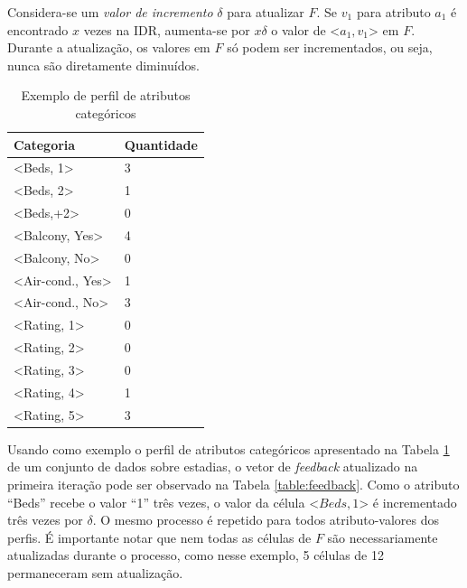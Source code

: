 Considera-se um {\em valor de incremento} $\delta$ para atualizar $F$. Se $v_1$ para atributo $a_1$ é encontrado $x$ vezes na IDR, aumenta-se por $x\delta$ o valor de \textless{}$a_1, v_1$\textgreater{} em $F$. Durante a atualização, os valores em $F$ só podem ser incrementados, ou seja, nunca são diretamente diminuídos.

\begin{table}[!h]
	\caption{Exemplo de perfil de atributos categóricos}
	\label{table:attribs}
	\centering
	\begin{tabular}{ll}
	\hline
	\textbf{Categoria}                      & \textbf{Quantidade} \\ \hline
	\textless{}Beds, 1\textgreater{}        & 3                   \\
	\textless{}Beds, 2\textgreater{}        & 1                   \\ 
	\textless{}Beds,+2\textgreater{}        & 0                   \\ 
	\textless{}Balcony, Yes\textgreater{}   & 4                   \\ 
	\textless{}Balcony, No\textgreater{}    & 0                   \\ 
	\textless{}Air-cond., Yes\textgreater{} & 1                   \\ 
	\textless{}Air-cond., No\textgreater{}  & 3                   \\ 
	\textless{}Rating, 1\textgreater{}      & 0                   \\ 
	\textless{}Rating, 2\textgreater{}      & 0                   \\ 
	\textless{}Rating, 3\textgreater{}      & 0                   \\ 
	\textless{}Rating, 4\textgreater{}      & 1                   \\ 
	\textless{}Rating, 5\textgreater{}      & 3                   \\ \hline
	\end{tabular}
	\mfonte
\end{table}

Usando como exemplo o perfil de atributos categóricos apresentado na Tabela \ref{table:attribs} de um conjunto de dados sobre estadias, o vetor de {\em feedback} atualizado na primeira iteração pode ser observado na Tabela \ref{table:feedback}. Como o atributo ``Beds'' recebe o valor ``1'' três vezes, o valor da célula \textless{}$Beds, 1$\textgreater{} é incrementado três vezes por $\delta$. O mesmo processo é repetido para todos atributo-valores dos perfis. É importante notar que nem todas as células de $F$ são necessariamente atualizadas durante o processo, como nesse exemplo, 5 células de 12 permaneceram sem atualização.

